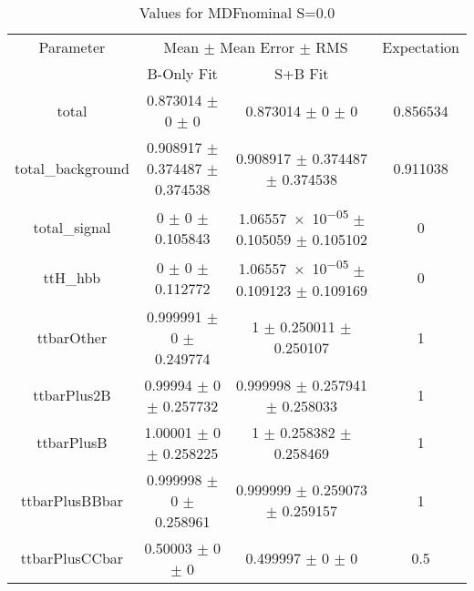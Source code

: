 \begin{table}
\centering
\caption{Values for MDFnominal S=0.0}
\begin{tabular}{cccc}
\toprule
Parameter & \multicolumn{2}{c}{Mean $\pm$ Mean Error $\pm$ RMS} & Expectation\\
 & B-Only Fit & S+B Fit & \\
\midrule
total & \num{0.873014} $\pm$ \num{0} $\pm$ \num{0} & \num{0.873014} $\pm$ \num{0} $\pm$ \num{0} & \num{0.856534}\\
total\_background & \num{0.908917} $\pm$ \num{0.374487} $\pm$ \num{0.374538} & \num{0.908917} $\pm$ \num{0.374487} $\pm$ \num{0.374538} & \num{0.911038}\\
total\_signal & \num{0} $\pm$ \num{0} $\pm$ \num{0.105843} & \num{1.06557e-05} $\pm$ \num{0.105059} $\pm$ \num{0.105102} & \num{0}\\
ttH\_hbb & \num{0} $\pm$ \num{0} $\pm$ \num{0.112772} & \num{1.06557e-05} $\pm$ \num{0.109123} $\pm$ \num{0.109169} & \num{0}\\
ttbarOther & \num{0.999991} $\pm$ \num{0} $\pm$ \num{0.249774} & \num{1} $\pm$ \num{0.250011} $\pm$ \num{0.250107} & \num{1}\\
ttbarPlus2B & \num{0.99994} $\pm$ \num{0} $\pm$ \num{0.257732} & \num{0.999998} $\pm$ \num{0.257941} $\pm$ \num{0.258033} & \num{1}\\
ttbarPlusB & \num{1.00001} $\pm$ \num{0} $\pm$ \num{0.258225} & \num{1} $\pm$ \num{0.258382} $\pm$ \num{0.258469} & \num{1}\\
ttbarPlusBBbar & \num{0.999998} $\pm$ \num{0} $\pm$ \num{0.258961} & \num{0.999999} $\pm$ \num{0.259073} $\pm$ \num{0.259157} & \num{1}\\
ttbarPlusCCbar & \num{0.50003} $\pm$ \num{0} $\pm$ \num{0} & \num{0.499997} $\pm$ \num{0} $\pm$ \num{0} & \num{0.5}\\
\bottomrule
\end{tabular}
\end{table}
